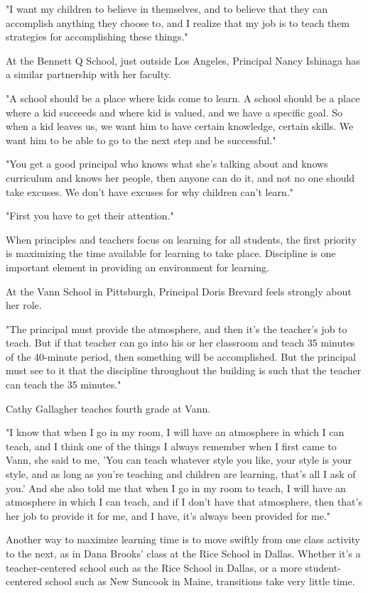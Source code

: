 "I want my children to believe in themselves, and to believe that they can accomplish anything they choose to, and I realize that my job is to teach them strategies for accomplishing these things."

At the Bennett Q School, just outside Los Angeles, Principal Nancy Ishinaga has a similar partnership with her faculty.

"A school should be a place where kids come to learn. A school should be a place where a kid succeeds and where kid is valued, and we have a specific goal. So when a kid leaves us, we want him to have certain knowledge, certain skills. We want him to be able to go to the next step and be successful."

"You get a good principal who knows what she's talking about and knows curriculum and knows her people, then anyone can do it, and not no one should take excuses. We don't have excuses for why children can't learn."

"First you have to get their attention."

When principles and teachers focus on learning for all students, the first priority is maximizing the time available for learning to take place. Discipline is one important element in providing an environment for learning.

At the Vann School in Pittsburgh, Principal Doris Brevard feels strongly about her role.

"The principal must provide the atmosphere, and then it's the teacher's job to teach. But if that teacher can go into his or her classroom and teach 35 minutes of the 40-minute period, then something will be accomplished. But the principal must see to it that the discipline throughout the building is such that the teacher can teach the 35 minutes."

Cathy Gallagher teaches fourth grade at Vann.

"I know that when I go in my room, I will have an atmosphere in which I can teach, and I think one of the things I always remember when I first came to Vann, she said to me, 'You can teach whatever style you like, your style is your style, and as long as you're teaching and children are learning, that's all I ask of you.' And she also told me that when I go in my room to teach, I will have an atmosphere in which I can teach, and if I don't have that atmosphere, then that's her job to provide it for me, and I have, it's always been provided for me."

Another way to maximize learning time is to move swiftly from one class activity to the next, as in Dana Brooks' class at the Rice School in Dallas. Whether it's a teacher-centered school such as the Rice School in Dallas, or a more student-centered school such as New Suncook in Maine, transitions take very little time.

